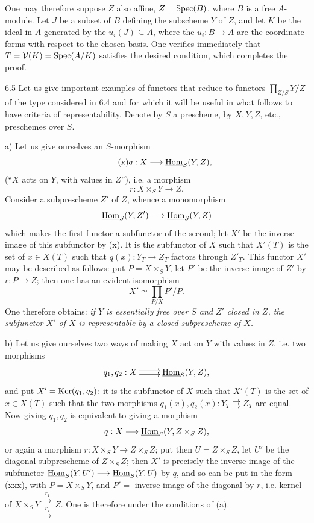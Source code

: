 One may therefore suppose $Z$ also affine, $Z=\operatorname{Spec}(B)$, where $B$ is a free $A$-module. Let $J$ be a subset of $B$ defining the subscheme $Y$ of $Z$, and let $K$ be the ideal in $A$ generated by the $u_i(J)\subseteq A$, where the $u_i:B\to A$ are the coordinate forms with respect to the chosen basis. One verifies immediately that $T=\mathcal V(K)=\operatorname{Spec}(A/K)$ satisfies the desired condition, which completes the proof.
\begin{examples}{6.5}\label{VIII.6.5}
Let us give important examples of functors that reduce to functors $\prod_{Z/S}Y/Z$ of the type considered in 6.4 and for which it will be useful in what follows to have criteria of representability. Denote by $S$ a prescheme, by $X,Y,Z$, etc., preschemes over $S$.

a) Let us give ourselves an $S$-morphism
\begin{equation}\tag{x}
q:X\longrightarrow\underline{\operatorname{Hom}}_S(Y,Z),
\end{equation}
(``$X$ acts on $Y$, with values in $Z$''), i.e. a morphism
\begin{equation}\tag{xx}
r:X\times_S Y\to Z.
\end{equation}
Consider a subprescheme $Z'$ of $Z$, whence a monomorphism
\[
\underline{\operatorname{Hom}}_S(Y,Z')\longrightarrow\underline{\operatorname{Hom}}_S(Y,Z)
\]
which makes the first functor a subfunctor of the second; let $X'$ be the inverse image of this subfunctor by (x). It is the subfunctor of $X$ such that $X'(T)$ is the set of $x\in X(T)$ such that $q(x):Y_T\to Z_T$ factors through $Z'_T$. This functor $X'$ may be described as follows: put $P=X\times_S Y$, let $P'$ be the inverse image of $Z'$ by $r:P\to Z$; then one has an evident isomorphism
\begin{equation}\tag{xxx}
X'\simeq\prod_{P/X}P'/P.
\end{equation}
One therefore obtains: \emph{if $Y$ is essentially free over $S$ and $Z'$ closed in $Z$, the subfunctor $X'$ of $X$ is representable by a closed subprescheme of $X$.}

b) Let us give ourselves two ways of making $X$ act on $Y$ with values in $Z$, i.e. two morphisms
\[
\xymatrix{q_1,q_2:X\ar@<.5ex>[r]\ar@<-.5ex>[r]&\uHom_S(Y,Z),}
\]
and put $X'=\operatorname{Ker}(q_1,q_2)$: it is the subfunctor of $X$ such that $X'(T)$ is the set of $x\in X(T)$ such that the two morphisms $q_1(x),q_2(x):Y_T\rightrightarrows Z_T$ are equal. Now giving $q_1,q_2$ is equivalent to giving a morphism
\[
q:X\longrightarrow\underline{\operatorname{Hom}}_S(Y,Z\times_S Z),
\]
or again a morphism $r:X\times_S Y\to Z\times_S Z$; put then $U=Z\times_S Z$, let $U'$ be the diagonal subprescheme of $Z\times_S Z$; then $X'$ is precisely the inverse image of the subfunctor $\underline{\operatorname{Hom}}_S(Y,U')\longrightarrow\underline{\operatorname{Hom}}_S(Y,U)$ by $q$, and so can be put in the form (xxx), with $P=X\times_S Y$, and $P'=$ inverse image of the diagonal by $r$, i.e. kernel of $X\times_S Y\mathrel{\substack{\xrightarrow{r_1}\\[-.8ex]\xrightarrow{r_2}}}Z$. One is therefore under the conditions of (a).


\end{examples}

